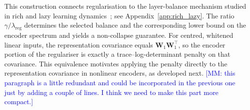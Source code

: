 \documentclass{article} %
\newcommand{\wa}{\mathbf{W}_1}
\theoremstyle{remark}
\newcommand{\mm}[1]{\textcolor{blue}{[MM: #1]}}
\begin{document}


This construction connects regularisation to the layer-balance
mechanism studied in rich and lazy learning
dynamics~\citep{dominé2024lazyrichexactlearning}; see
Appendix~\ref{app:rich_lazy}.
The ratio $\gamma/\lambda_{\mathrm{reg}}$ determines the selected
balance and the corresponding lower bound on the encoder spectrum and yields a non-collapse guarantee.
For centred, whitened linear inputs, the representation covariance
equals $\wa\wa^\top$, so the encoder portion of the regulariser
is exactly a trace--log-determinant penalty on that covariance.
This equivalence motivates applying the penalty directly to the
representation covariance in nonlinear encoders, as developed next. \mm{this paragraph is a little redundant and could be incorporated in the previous one just by adding a couple of lines. I think we need to make this part more compact.}






\end{document}
